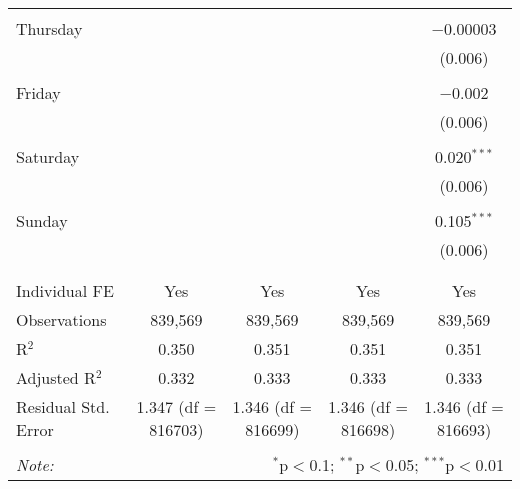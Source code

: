 \documentclass[
]{article}
\begin{document}
\begin{table}[!htbp]
{\begin{tabular}{@{\extracolsep{5pt}}lcccc}
  & & & & \\ 
 Thursday &  &  &  & $-$0.00003 \\ 
  &  &  &  & (0.006) \\ 
  & & & & \\ 
 Friday &  &  &  & $-$0.002 \\ 
  &  &  &  & (0.006) \\ 
  & & & & \\ 
 Saturday &  &  &  & 0.020$^{***}$ \\ 
  &  &  &  & (0.006) \\ 
  & & & & \\ 
 Sunday &  &  &  & 0.105$^{***}$ \\ 
  &  &  &  & (0.006) \\ 
  & & & & \\ 
\hline \\[-1.8ex] 
Individual FE & Yes & Yes & Yes & Yes \\ 
Observations & 839,569 & 839,569 & 839,569 & 839,569 \\ 
R$^{2}$ & 0.350 & 0.351 & 0.351 & 0.351 \\ 
Adjusted R$^{2}$ & 0.332 & 0.333 & 0.333 & 0.333 \\ 
Residual Std. Error & 1.347 (df = 816703) & 1.346 (df = 816699) & 1.346 (df = 816698) & 1.346 (df = 816693) \\ 
\hline 
\hline \\[-1.8ex] 
\textit{Note:}  & \multicolumn{4}{r}{$^{*}$p$<$0.1; $^{**}$p$<$0.05; $^{***}$p$<$0.01} \\ 
\end{tabular}
} 
\end{table} 
\newpage
\end{document}
